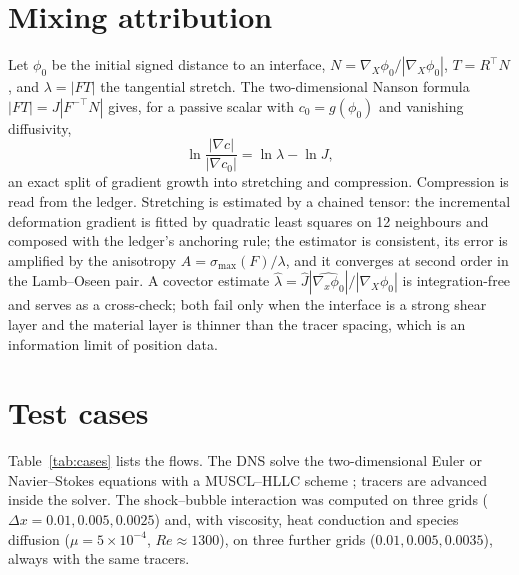 \documentclass[11pt]{article}
\theoremstyle{definition}\newtheorem{definition}{Definition}\theoremstyle{remark}\newtheorem{remark}{Remark}
\begin{document}
\section{Mixing attribution}\label{sec:mixing}
Let $\phi_0$ be the initial signed distance to an interface, $N=\nabla_X\phi_0/|\nabla_X\phi_0|$, $T=R^\top N$, and $\lambda=|FT|$ the tangential stretch. The two-dimensional Nanson formula $|FT|=J|F^{-\top}N|$ gives, for a passive scalar with $c_0=g(\phi_0)$ and vanishing diffusivity,
\begin{equation}
\ln\frac{|\nabla c|}{|\nabla c_0|}=\ln\lambda-\ln J,
\end{equation}
an exact split of gradient growth into stretching and compression. Compression is read from the ledger. Stretching is estimated by a chained tensor: the incremental deformation gradient is fitted by quadratic least squares on 12 neighbours and composed with the ledger's anchoring rule; the estimator is consistent, its error is amplified by the anisotropy $A=\sigma_{\max}(F)/\lambda$, and it converges at second order in the Lamb--Oseen pair. A covector estimate $\hat\lambda=\hat J|\widehat{\nabla_x\phi_0}|/|\nabla_X\phi_0|$ is integration-free and serves as a cross-check; both fail only when the interface is a strong shear layer and the material layer is thinner than the tracer spacing, which is an information limit of position data.

\section{Test cases}
Table~\ref{tab:cases} lists the flows. The DNS solve the two-dimensional Euler or Navier--Stokes equations with a MUSCL--HLLC scheme \citep{Toro1994}; tracers are advanced inside the solver. The shock--bubble interaction was computed on three grids ($\Delta x=0.01,0.005,0.0025$) and, with viscosity, heat conduction and species diffusion ($\mu=5\times10^{-4}$, $Re\approx1300$), on three further grids ($0.01,0.005,0.0035$), always with the same tracers.
\end{document}
